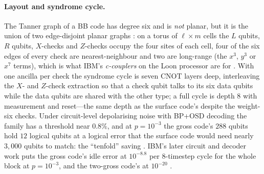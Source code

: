 \paragraph{Layout and syndrome cycle.} The Tanner graph of a BB code has degree six and is \emph{not} planar, but it is the union of two edge-disjoint planar graphs \cite{bravyi24gross}: on a torus of $\ell\times m$ cells the $L$ qubits, $R$ qubits, $X$-checks and $Z$-checks occupy the four sites of each cell, four of the six edges of every check are nearest-neighbour and two are long-range (the $x^3$, $y^3$ or $x^7$ terms), which is what IBM's \emph{c-couplers} on the Loon processor are for \cite{ibm-blog25}. With one ancilla per check the syndrome cycle is seven CNOT layers deep, interleaving the $X$- and $Z$-check extraction so that a check qubit talks to its six data qubits while the data qubits are shared with the other type; a full cycle is depth $8$ with measurement and reset---the same depth as the surface code's despite the weight-six checks. Under circuit-level depolarising noise with BP+OSD decoding the family has a threshold near $0.8\%$, and at $p=10^{-3}$ the gross code's $288$ qubits hold $12$ logical qubits at a logical error that the surface code would need nearly $3{,}000$ qubits to match: the ``tenfold'' saving \cite{bravyi24gross}. IBM's later circuit and decoder work puts the gross code's idle error at $10^{-8.8}$ per $8$-timestep cycle for the whole block at $p=10^{-3}$, and the two-gross code's at $10^{-20}$ \cite{yoder25tour}.

